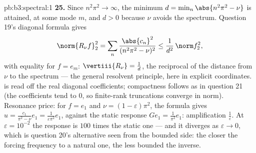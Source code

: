 \begin{solution}{pb:b3:spectral:1}
\textbf{25.} Since $n^2\pi^2 \to \infty$, the minimum $d =
\min_n\abs{n^2\pi^2 - \nu}$ is attained, at some mode $m$,
and $d > 0$ because $\nu$ avoids the spectrum. Question 19's
diagonal formula gives
\[
\norm{R_\nu f}_2^2 =
\sum_n\frac{\abs{c_n}^2}{(n^2\pi^2 - \nu)^2}
\leq \frac1{d^2}\,\norm f_2^2,
\]
with equality for $f = e_m$: $\vertiii{R_\nu} = \frac1d$,
the reciprocal of the distance from $\nu$ to the spectrum
--- the general resolvent principle, here in explicit
coordinates.  is read off the real diagonal
coefficients; compactness follows as in question 21 (the
coefficients tend to $0$, so finite-rank truncations
converge in norm). Resonance price: for $f = e_1$ and $\nu =
(1-\varepsilon)\pi^2$, the formula gives $u =
\frac{c_1}{\pi^2 - \nu}e_1 = \frac1{\varepsilon\pi^2}e_1$,
against the static response $Ge_1 = \frac1{\pi^2}e_1$:
amplification $\frac1\varepsilon$. At $\varepsilon =
10^{-2}$ the response is $100$ times the static one --- and
it diverges as $\varepsilon \to 0$, which is question 20's
alternative seen from the bounded side: the closer the
forcing frequency to a natural one, the less bounded the
inverse.
\end{solution}
